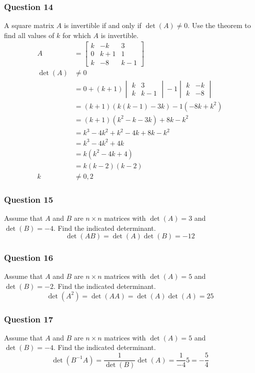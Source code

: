 \documentclass{math}
\begin{document}
\subsubsection*{Question 14}
A square matrix \( A \) is invertible if and only if \( \det(A)\ne0 \). Use the
theorem to find all values of \( k \) for which \( A \) is invertible.
\begin{align*}
  A &= \begin{bmatrix}
    k & -k & 3 \\
    0 & k+1 & 1 \\
    k & -8 & k-1
  \end{bmatrix} \\
  \det(A) &\ne 0 \\
  &= 0+(k+1)\begin{vmatrix}
    k & 3 \\
    k & k-1
  \end{vmatrix}-1\begin{vmatrix}
    k & -k \\
    k & -8
  \end{vmatrix} \\
  &= (k+1)(k(k-1)-3k)-1(-8k+k^2) \\
  &= (k+1)(k^2-k-3k)+8k-k^2 \\
  &= k^3-4k^2+k^2-4k+8k-k^2 \\
  &= k^3-4k^2+4k \\
  &= k(k^2-4k+4) \\
  &= k(k-2)(k-2) \\
  k &\ne 0,2
\end{align*}

\subsubsection*{Question 15}
Assume that \( A \) and \( B \) are \( n\times n \) matrices with
\( \det(A) = 3 \) and \( \det(B) = -4 \). Find the indicated determinant.
\[ \det(AB) = \det(A)\det(B) = -12 \]

\subsubsection*{Question 16}
Assume that \( A \) and \( B \) are \( n\times n \) matrices with
\( \det(A) = 5 \) and \( \det(B) = -2 \). Find the indicated determinant.
\[ \det(A^2) = \det(AA) = \det(A)\det(A) = 25 \]

\subsubsection*{Question 17}
Assume that \( A \) and \( B \) are \( n\times n \) matrices with
\( \det(A) = 5 \) and \( \det(B) = -4 \). Find the indicated determinant.
\[ \det(B^{-1}A) = \frac{1}{\det(B)}\det(A) = \frac{1}{-4}5 = -\frac{5}{4} \]
\end{document}
